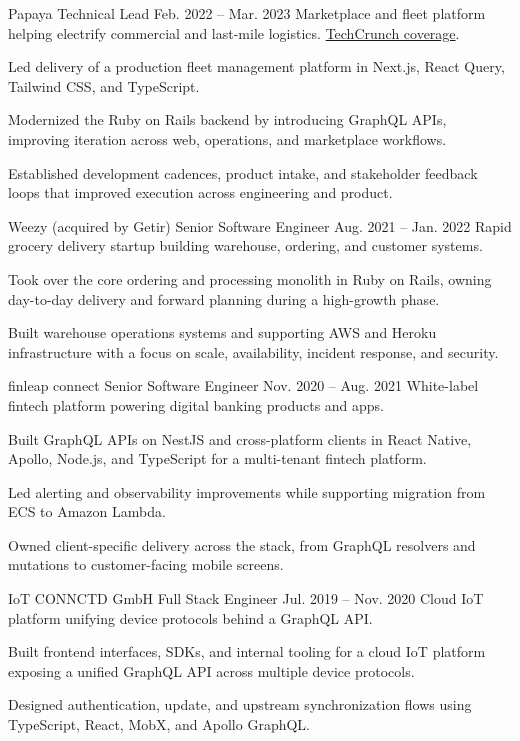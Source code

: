 \ResumeJob
  {Papaya}
  {Technical Lead}
  {Feb. 2022 -- Mar. 2023}
  {Marketplace and fleet platform helping electrify commercial and last-mile logistics. \href{https://techcrunch.com/2022/09/27/papaya-wants-to-help-electrify-last-mile-logistics-in-europe/}{TechCrunch coverage}.}
\begin{ResumeList}
  \item Led delivery of a production fleet management platform in Next.js, React Query, Tailwind CSS, and TypeScript.
  \item Modernized the Ruby on Rails backend by introducing GraphQL APIs, improving iteration across web, operations, and marketplace workflows.
  \item Established development cadences, product intake, and stakeholder feedback loops that improved execution across engineering and product.
\end{ResumeList}

\ResumeJob
  {Weezy (acquired by Getir)}
  {Senior Software Engineer}
  {Aug. 2021 -- Jan. 2022}
  {Rapid grocery delivery startup building warehouse, ordering, and customer systems.}
\begin{ResumeList}
  \item Took over the core ordering and processing monolith in Ruby on Rails, owning day-to-day delivery and forward planning during a high-growth phase.
  \item Built warehouse operations systems and supporting AWS and Heroku infrastructure with a focus on scale, availability, incident response, and security.
\end{ResumeList}

\ResumeJob
  {finleap connect}
  {Senior Software Engineer}
  {Nov. 2020 -- Aug. 2021}
  {White-label fintech platform powering digital banking products and apps.}
\begin{ResumeList}
  \item Built GraphQL APIs on NestJS and cross-platform clients in React Native, Apollo, Node.js, and TypeScript for a multi-tenant fintech platform.
  \item Led alerting and observability improvements while supporting migration from ECS to Amazon Lambda.
  \item Owned client-specific delivery across the stack, from GraphQL resolvers and mutations to customer-facing mobile screens.
\end{ResumeList}

\ResumeJob
  {IoT CONNCTD GmbH}
  {Full Stack Engineer}
  {Jul. 2019 -- Nov. 2020}
  {Cloud IoT platform unifying device protocols behind a GraphQL API.}
\begin{ResumeList}
  \item Built frontend interfaces, SDKs, and internal tooling for a cloud IoT platform exposing a unified GraphQL API across multiple device protocols.
  \item Designed authentication, update, and upstream synchronization flows using TypeScript, React, MobX, and Apollo GraphQL.
\end{ResumeList}
